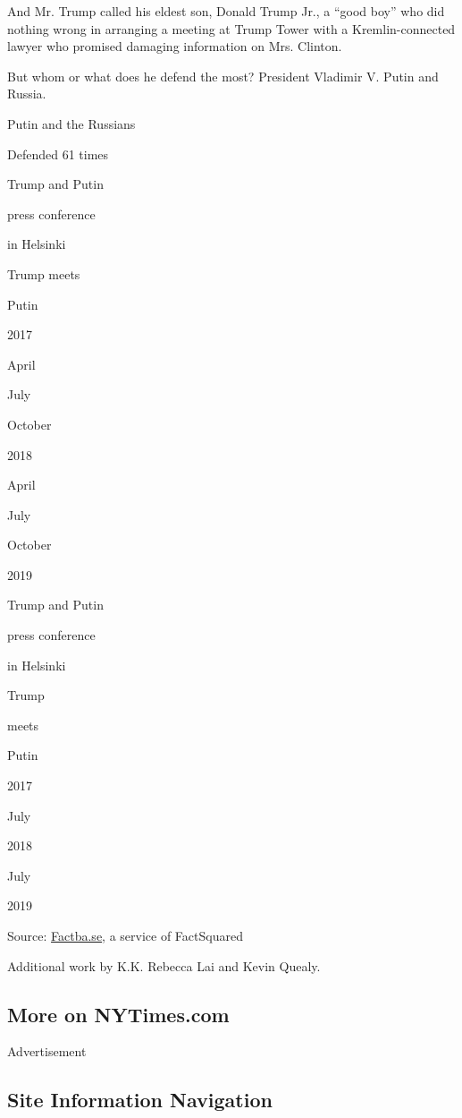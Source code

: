 And Mr. Trump called his eldest son, Donald Trump Jr., a ``good boy''
who did nothing wrong in arranging a meeting at Trump Tower with a
Kremlin-connected lawyer who promised damaging information on Mrs.
Clinton.

But whom or what does he defend the most? President Vladimir V. Putin
and Russia.

Putin and the Russians

Defended 61 times

Trump and Putin

press conference

in Helsinki

Trump meets

Putin

2017

April

July

October

2018

April

July

October

2019

Trump and Putin

press conference

in Helsinki

Trump

meets

Putin

2017

July

2018

July

2019

Source: \href{https://factba.se/}{Factba.se}, a service of FactSquared

Additional work by K.K. Rebecca Lai and Kevin Quealy.

\hypertarget{more-on-nytimescom}{%
\subsection{More on NYTimes.com}\label{more-on-nytimescom}}

Advertisement

\hypertarget{site-information-navigation}{%
\subsection{Site Information
Navigation}\label{site-information-navigation}}

